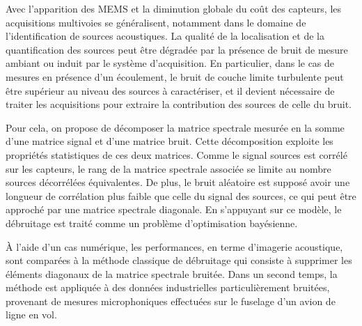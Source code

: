 \documentclass[12pt]{article}
\begin{document}
Avec l'apparition des MEMS et la diminution globale du coût des capteurs, les acquisitions multivoies se généralisent, notamment dans le domaine de l'identification de sources acoustiques. La qualité de la localisation et de la quantification des sources peut être dégradée par la présence de bruit de mesure ambiant ou induit par le système d'acquisition. En particulier, dans le cas de mesures en présence d'un écoulement, le bruit de couche limite turbulente peut être supérieur au niveau des sources à caractériser, et il devient nécessaire de traiter les acquisitions pour extraire la contribution des sources de celle du bruit.

 Pour cela, on propose de décomposer la matrice spectrale mesurée en la somme d'une matrice signal et d'une matrice bruit. Cette décomposition exploite les propriétés statistiques de ces deux matrices. Comme le signal sources est corrélé sur les capteurs, le rang de la matrice spectrale associée se limite au nombre sources décorrélées équivalentes. De plus, le bruit aléatoire est supposé avoir une longueur de corrélation plus faible que celle du signal des sources, ce qui peut être approché par une matrice spectrale diagonale. En s'appuyant sur ce modèle, le débruitage est traité comme un problème d'optimisation bayésienne. 
 
À l'aide d'un cas numérique, les performances, en terme d'imagerie acoustique, sont comparées à la méthode classique de débruitage qui consiste à supprimer les éléments diagonaux de la matrice spectrale bruitée.
Dans un second temps, la méthode est appliquée à des données industrielles particulièrement bruitées, provenant de mesures microphoniques effectuées sur le fuselage d'un avion de ligne en vol.
\end{document}
